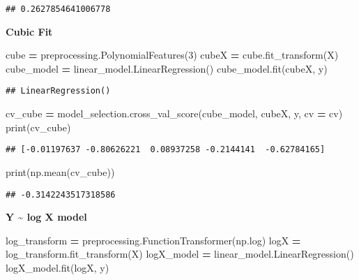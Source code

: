 \documentclass[
]{book}
\newenvironment{Shaded}{\begin{snugshade}}{\end{snugshade}}
\newcommand{\BuiltInTok}[1]{#1}
\newcommand{\DecValTok}[1]{\textcolor[rgb]{0.00,0.00,0.81}{#1}}
\newcommand{\NormalTok}[1]{#1}
\newcommand{\OperatorTok}[1]{\textcolor[rgb]{0.81,0.36,0.00}{\textbf{#1}}}
\begin{document}
\begin{verbatim}
## 0.2627854641006778
\end{verbatim}

\textbf{Cubic Fit}

\begin{Shaded}
\begin{Highlighting}[]
\NormalTok{cube }\OperatorTok{=}\NormalTok{ preprocessing.PolynomialFeatures(}\DecValTok{3}\NormalTok{)}
\NormalTok{cubeX }\OperatorTok{=}\NormalTok{ cube.fit\_transform(X)}
\NormalTok{cube\_model }\OperatorTok{=}\NormalTok{ linear\_model.LinearRegression()}
\NormalTok{cube\_model.fit(cubeX, y)}
\end{Highlighting}
\end{Shaded}

\begin{verbatim}
## LinearRegression()
\end{verbatim}

\begin{Shaded}
\begin{Highlighting}[]
\NormalTok{cv\_cube }\OperatorTok{=}\NormalTok{ model\_selection.cross\_val\_score(cube\_model, cubeX, y, cv }\OperatorTok{=}\NormalTok{ cv)}
\BuiltInTok{print}\NormalTok{(cv\_cube)}
\end{Highlighting}
\end{Shaded}

\begin{verbatim}
## [-0.01197637 -0.80626221  0.08937258 -0.2144141  -0.62784165]
\end{verbatim}

\begin{Shaded}
\begin{Highlighting}[]
\BuiltInTok{print}\NormalTok{(np.mean(cv\_cube))}
\end{Highlighting}
\end{Shaded}

\begin{verbatim}
## -0.3142243517318586
\end{verbatim}

\textbf{Y \textasciitilde{} log X model}

\begin{Shaded}
\begin{Highlighting}[]
\NormalTok{log\_transform }\OperatorTok{=}\NormalTok{ preprocessing.FunctionTransformer(np.log)}
\NormalTok{logX }\OperatorTok{=}\NormalTok{ log\_transform.fit\_transform(X)}
\NormalTok{logX\_model }\OperatorTok{=}\NormalTok{ linear\_model.LinearRegression()}
\NormalTok{logX\_model.fit(logX, y)}
\end{Highlighting}
\end{Shaded}
\end{document}
